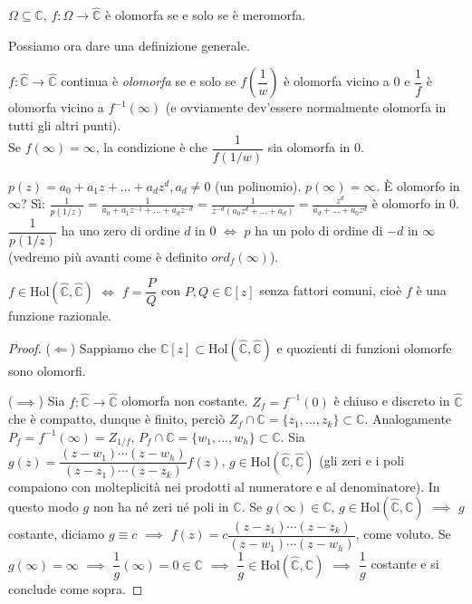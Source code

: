\begin{cor}
  $\Omega \subseteq \mathbb{C}$, $f:\Omega \longrightarrow \hat{\mathbb{C}}$ è olomorfa se e solo se è meromorfa.
\end{cor}

Possiamo ora dare una definizione generale.

\begin{defn}
  $f:\hat{\mathbb{C}} \longrightarrow \hat{\mathbb{C}}$ continua è \textit{olomorfa} se e solo se $f\left(\dfrac{1}{w}\right)$ è olomorfa vicino a $0$ e $\dfrac{1}{f}$ è olomorfa vicino a $f^{-1}(\infty)$ (e ovviamente dev'essere normalmente olomorfa in tutti gli altri punti). \\
  Se $f(\infty)=\infty$, la condizione è che $\dfrac{1}{f(1/w)}$ sia olomorfa in $0$.
\end{defn}

\begin{ex}
  $p(z)=a_0+a_1z+\dots+a_dz^d, a_d \not=0$ (un polinomio). $p(\infty)=\infty$. È olomorfo in $\infty$? Sì: $\displaystyle \frac{1}{p(1/z)}=\frac{1}{a_0+a_1z^{-1}+\dots+a_dz^{-d}}=\frac{1}{z^{-d}(a_0z^d+\dots+a_d)}=\frac{z^d}{a_d+\dots+a_0z^d}$ è olomorfo in $0$.
  $\dfrac{1}{p(1/z)}$ ha uno zero di ordine $d$ in $0$ $\iff$ $p$ ha un polo di ordine di $-d$ in $\infty$ (vedremo più avanti come è definito $ord_f(\infty)$).
\end{ex}

\begin{prop}
  $f \in \text{Hol}(\hat{\mathbb{C}}, \hat{\mathbb{C}})$ $\iff$ $f=\dfrac{P}{Q}$ con $P, Q \in \mathbb{C}[z]$ senza fattori comuni, cioè $f$ è una funzione razionale.
\end{prop}

\begin{proof}
  ($\Leftarrow$) Sappiamo che $\mathbb{C}[z] \subset \text{Hol}(\hat{\mathbb{C}}, \hat{\mathbb{C}})$ e quozienti di funzioni olomorfe sono olomorfi.

  ($\implies$) Sia $f: \hat{\mathbb{C}} \longrightarrow \hat{\mathbb{C}}$ olomorfa non costante. $Z_f=f^{-1}(0)$ è chiuso e discreto in $\hat{\mathbb{C}}$ che è compatto, dunque è finito, perciò $Z_f \cap \mathbb{C}=\{z_1, \dots, z_k\} \subset \mathbb{C}$.
  Analogamente $P_f=f^{-1}(\infty)=Z_{1/f}$, $P_f \cap \mathbb{C}=\{w_1, \dots, w_h\} \subset \mathbb{C}$. Sia $g(z)=\dfrac{(z-w_1)\cdots(z-w_h)}{(z-z_1) \cdots (z-z_k)}f(z)$, $g \in \text{Hol}(\hat{\mathbb{C}}, \hat{\mathbb{C}})$ (gli zeri e i poli compaiono con molteplicità nei prodotti al numeratore e al denominatore).
  In questo modo $g$ non ha né zeri né poli in $\mathbb{C}$. Se $g(\infty) \in \mathbb{C}$, $g \in \text{Hol}(\hat{\mathbb{C}}, \mathbb{C})$ $\implies$ $g$ costante, diciamo $g \equiv c$ $\implies$ $f(z)=c\dfrac{(z-z_1) \cdots (z-z_k)}{(z-w_1)\cdots(z-w_h)}$, come voluto.
  Se $g(\infty)=\infty$ $\implies$ $\dfrac{1}{g}(\infty)=0 \in \mathbb{C}$ $\implies$ $\dfrac{1}{g} \in \text{Hol}(\hat{\mathbb{C}}, \mathbb{C})$ $\implies$ $\dfrac{1}{g}$ costante e si conclude come sopra.
\end{proof}

